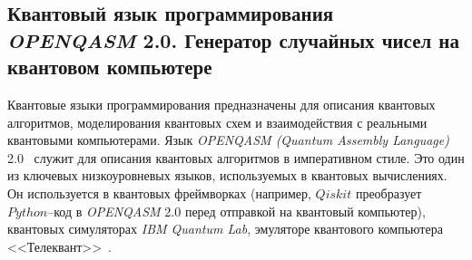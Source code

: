 \documentclass[12pt,a4paper]{article}
\begin{document}
	\subsection{Квантовый язык программирования \textit{OPENQASM} 2.0. Генератор случайных чисел на квантовом компьютере}
	Квантовые языки программирования предназначены для описания квантовых алгоритмов, моделирования квантовых схем и взаимодействия с реальными квантовыми компьютерами. Язык \textit{OPENQASM (Quantum Assembly Language)} 2.0~\cite{openqasm} служит для описания квантовых алгоритмов в императивном стиле. Это один из ключевых низкоуровневых  языков, используемых в квантовых вычислениях. Он используется в квантовых фреймворках (например, $Qiskit$ преобразует $Python$--код в \textit{OPENQASM} 2.0 перед отправкой на квантовый компьютер), квантовых симуляторах \textit{IBM Quantum Lab}, эмуляторе квантового компьютера <<Телеквант>>~\cite{Telequant}.
	
\end{document}
